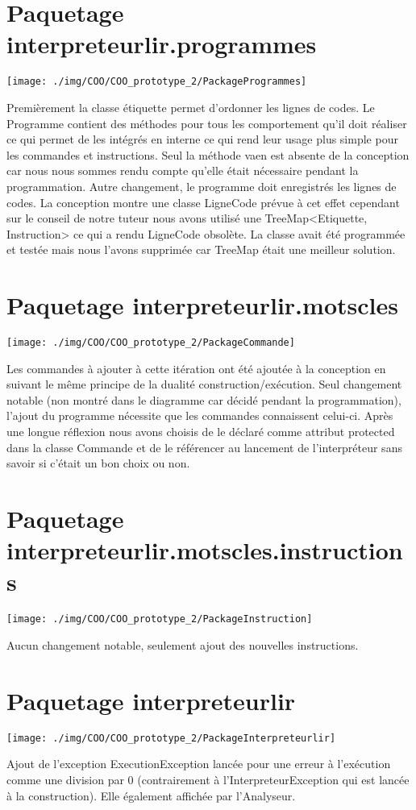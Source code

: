 \section{Paquetage interpreteurlir.programmes}
\texttt{[image: ./img/COO/COO\_prototype\_2/PackageProgrammes]}
\par Premièrement la classe étiquette permet d'ordonner les lignes de codes. Le Programme contient des méthodes pour tous les comportement qu'il doit réaliser ce qui permet de les intégrés en interne ce qui rend leur usage plus simple pour les commandes et instructions. Seul la méthode vaen est absente de la conception car nous nous sommes rendu compte qu'elle était nécessaire pendant la programmation. Autre changement, le programme doit enregistrés les lignes de codes. La conception montre une classe LigneCode prévue à cet effet cependant sur le conseil de notre tuteur nous avons utilisé une TreeMap<Etiquette, Instruction> ce qui a rendu LigneCode obsolète. La classe avait été programmée et testée mais nous l'avons supprimée car TreeMap était une meilleur solution.

\section{Paquetage interpreteurlir.motscles} 
\texttt{[image: ./img/COO/COO\_prototype\_2/PackageCommande]}
\par Les commandes à ajouter à cette itération ont été ajoutée à la conception en suivant le même principe de la dualité construction/exécution. Seul changement notable (non montré dans le diagramme car décidé pendant la programmation), l'ajout du programme nécessite que les commandes connaissent celui-ci. Après une longue réflexion nous avons choisis de le déclaré comme attribut protected dans la classe Commande et de le référencer au lancement de l'interpréteur sans savoir si c'était un bon choix ou non.

\section{Paquetage interpreteurlir.motscles.instructions} 
\texttt{[image: ./img/COO/COO\_prototype\_2/PackageInstruction]}
\par Aucun changement notable, seulement ajout des nouvelles instructions.

\section{Paquetage interpreteurlir}
\texttt{[image: ./img/COO/COO\_prototype\_2/PackageInterpreteurlir]}
\par Ajout de l'exception ExecutionException lancée pour une erreur à l'exécution comme une division par 0 (contrairement à l'InterpreteurException qui est lancée à la construction). Elle également affichée par l'Analyseur.
